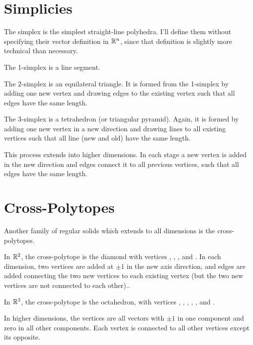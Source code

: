\documentclass[fleqn]{report}
\begin{document}
\section{Simplicies}

The simplex is the simplest straight-line polyhedra.
I'll define them without specifying their vector definition in
$\mathbb{R}^n$, since that definition is slightly more technical than
necessary.
\begin{smallitemize}
\item The 1-simplex is a line segment. 
\item The 2-simplex is an equilateral triangle. It is formed
from the 1-simplex by adding one new vertex and drawing edges
to the existing vertex such that all edges have the same
length.
\item The 3-simplex is a tetrahedron (or triangular pyramid).
Again, it is formed by adding one new vertex in a new
direction and drawing lines to all existing vertices such that
all line (new and old) have the same length.
\item This process extends into higher dimensions. In each stage a new
vertex is added in the new direction and edges connect it to
all previous vertices, such that all edges have the same
length. 
\end{smallitemize}

\section{Cross-Polytopes}

Another family of regular solids which extends to all
dimensions is the cross-polytopes. 
\begin{smallitemize}
\item In $\mathbb{R}^2$, the cross-polytope is the diamond with
vertices ,
,
, and
. In each dimension, two
vertices are added at $\pm 1$ in the new axis direction, and
edges are added connecting the two new vertices to each
existing vertex (but the two new vertices are not connected to
each other).. 
\item In $\mathbb{R}^3$, the cross-polytope is the octahedron, with
vertices
, 
, 
, 
, 
, and
. 
\item In higher dimensions, the vertices are all vectors with
$\pm 1$ in one component and zero in all other components.
Each vertex is connected to all other vertices except its
opposite.
\end{smallitemize}
\end{document}
